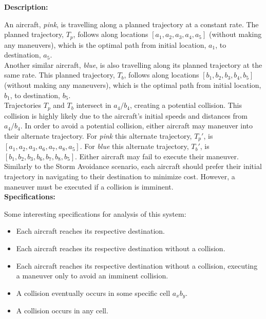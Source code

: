 \documentclass{article}
\begin{document}
\textbf{Description:}

An aircraft, \textit{pink}, is travelling along a planned trajectory at a constant rate. The planned trajectory, $T_{p}$, follows along locations $[a_1, a_2, a_3, a_4, a_5]$ (without making any maneuvers), which is the optimal path from initial location, $a_1$, to destination, $a_5$.\\

Another similar aircraft, \textit{blue}, is also travelling along its planned trajectory at the same rate. This planned trajectory, $T_{b}$, follows along locations $[b_1, b_2, b_3, b_4, b_5]$ (without making any maneuvers), which is the optimal path from initial location, $b_1$, to destination, $b_5$. \\

Trajectories $T_p$ and $T_b$ intersect in $a_4/b_4$, creating a potential collision. This collision is highly likely due to the aircraft's initial speeds and distances from $a_4/b_4$. In order to avoid a potential collision, either aircraft may maneuver into their alternate trajectory. For \textit{pink} this alternate trajectory, $T_p'$, is $[a_1, a_2, a_3, a_6, a_7, a_8, a_5]$. For \textit{blue} this alternate trajectory, $T_b'$, is $[b_1, b_2, b_3, b_6, b_7, b_8, b_5]$. Either aircraft may fail to execute their maneuver. \\

Similarly to the Storm Avoidance scenario, each aircraft should prefer their initial trajectory in navigating to their destination to minimize cost. However, a maneuver must be executed if a collision is imminent. \\

\textbf{Specifications:}

Some interesting specifications for analysis of this system:
\begin{itemize}
 \item Each aircraft reaches its respective destination.

 \item Each aircraft reaches its respective destination without a collision.

 \item Each aircraft reaches its respective destination without a collision, executing a maneuver only to avoid an imminent collision.

 \item A collision eventually occurs in some specific cell $a_xb_y$.

 \item A collision occurs in any cell.
\end{itemize}
\end{document}
